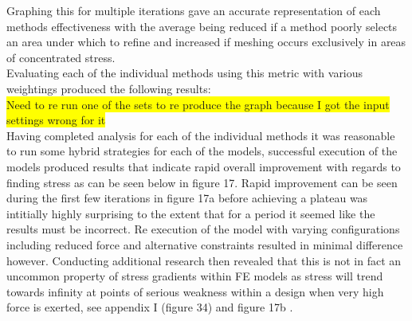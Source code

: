 \noindent
Graphing this for multiple iterations gave an accurate representation of each methods effectiveness with the average being reduced if a method poorly selects an area under which to refine and increased if meshing occurs exclusively in areas of concentrated stress. \\

\noindent
Evaluating each of the individual methods using this metric with various weightings produced the following results: \\ 

\colorbox{yellow}{Need to re run one of the sets to re produce the graph because I got the input settings wrong for it} \\ 

\noindent
Having completed analysis for each of the individual methods it was reasonable to run some hybrid strategies for each of the models, successful execution of the models produced results that indicate rapid overall improvement with regards to finding stress as can be seen below in figure 17. Rapid improvement can be seen during the first few iterations in figure 17a before achieving a plateau was intitially highly surprising to the extent that for a period it seemed like the results must be incorrect. Re execution of the model with varying configurations including reduced force and alternative constraints resulted in minimal difference however. Conducting additional research then revealed that this is not in fact an uncommon property of stress gradients within FE models as stress will trend towards infinity at points of serious weakness within a design when very high force is exerted, see appendix I (figure 34) and figure 17b \cite{StressConcerntration}.  \\

